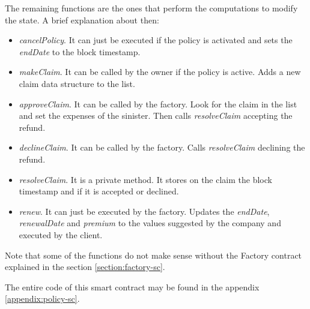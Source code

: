 {The remaining functions are the ones that perform the computations to modify the state. A brief explanation about then:
\begin{itemize}
    \item \textit{cancelPolicy}. It can just be executed if the policy is activated and sets the \textit{endDate} to the block timestamp.
    \item \textit{makeClaim}. It can be called by the owner if the policy is active. Adds a new claim data structure to the list.
    \item \textit{approveClaim}. It can be called by the factory. Look for the claim in the list and set the expenses of the sinister. Then calls \textit{resolveClaim} accepting the refund.
    \item \textit{declineClaim}. It can be called by the factory. Calls \textit{resolveClaim} declining the refund.
    \item \textit{resolveClaim}. It is a private method. It stores on the claim the block timestamp and if it is accepted or declined.
    \item \textit{renew}. It can just be executed by the factory. Updates the \textit{endDate}, \textit{renewalDate} and \textit{premium} to the values suggested by the company and executed by the client.
\end{itemize}

Note that some of the functions do not make sense without the Factory contract explained in the section \ref{section:factory-sc}.

The entire code of this smart contract may be found in the appendix \ref{appendix:policy-sc}.
}

